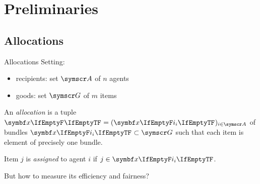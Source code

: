 \section{Preliminaries}

\subsection{Allocations}
\begin{frame}{Allocations}
	Setting:
	\begin{itemize}
		\item
		recipients: set \(\agents\) of \(n\) agents

		\item
		goods: set \(\goods\) of \(m\) items
%
	\end{itemize}
	\begin{definition}
		An \emph{allocation} is a tuple
		\(\alloc[][] = (\alloc)_{i \in \agents}\)
		of bundles \(\alloc \subset \goods\) such that each item is element of precisely one bundle.

		Item \(j\) is \emph{assigned} to agent \(i\) if \(j \in \alloc\).
	\end{definition}

	But how to measure its efficiency and fairness?
\end{frame}





